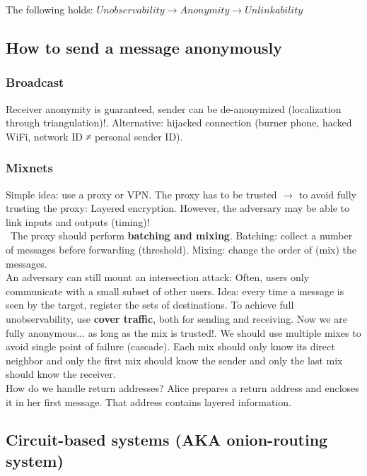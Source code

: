 \documentclass[11pt,oneside,a4paper]{article}
\begin{document}
\noindent The following holds: $Unobservability \rightarrow Anonymity \rightarrow Unlinkability$

\subsection{How to send a message anonymously}

\subsubsection{Broadcast}

Receiver anonymity is guaranteed, sender can be de-anonymized (localization through triangulation)!. Alternative: hijacked connection (burner phone, hacked WiFi, network ID ≠ personal sender ID).

\subsubsection{Mixnets}

Simple idea: use a proxy or VPN. The proxy has to be trusted $\rightarrow$ to avoid fully trusting the proxy: Layered encryption. However, the adversary may be able to link inputs
and outputs (timing)!\\\
The proxy should perform \textbf{batching and mixing}. Batching: collect a number of messages
before forwarding (threshold). Mixing: change the order of (mix) the messages.\\
An adversary can still mount an intersection attack: Often, users only communicate with a
small subset of other users. Idea: every time a message is seen by the target, register the sets of destinations. To achieve full unobservability, use \textbf{cover traffic}, both for sending and receiving. Now we are fully anonymous... as long as the mix is trusted!. We should use multiple mixes to avoid single point of failure (cascade). Each mix should only know its direct neighbor and only the first mix should know the sender and only the last mix should know the receiver.\\
\indent How do we handle return addresses? Alice prepares a return address and encloses it in her first message. That address contains layered information.

\subsection{Circuit-based systems (AKA onion-routing system)}
\end{document}
